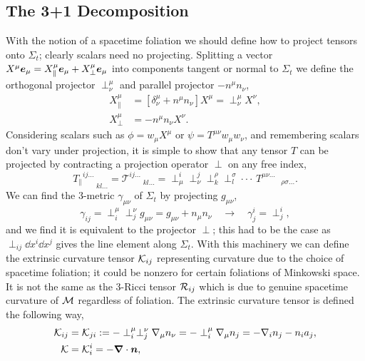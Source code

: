\subsection{The 3+1 Decomposition}
With the notion of a spacetime foliation we should define how to project tensors onto $\Sigma_t$; clearly scalars need no projecting. Splitting a vector $X^\mu \boldsymbol{e}_\mu = X^\mu_\| \boldsymbol{e}_\mu + X^\mu_\perp \boldsymbol{e}_\mu$ into components tangent or normal to $\Sigma_t$ we define the orthogonal projector $\perp^\mu_\nu$ and parallel projector $-n^\mu n_\nu$,
\begin{align}X^\mu_\| &= \left[ \delta^\mu_\nu + n^\mu n_\nu\right] X^\mu  = \perp^\mu_\nu X^\nu,\\
X^\mu_\perp &= -n^\mu n_\nu X^\nu .\end{align}
Considering scalars such as $\phi = w_\mu X^\mu$ or $\psi = T^{\mu\nu}w_\mu w_\nu$, and remembering scalars don't vary under projection, it is simple to show that any tensor $T$ can be projected by contracting a projection operator $\perp$ on any free index,
\begin{equation} {T_\|}^{ij ...}_{\;\;\;\;\;\;\;kl ...} = {\mathcal{T}}^{ij ...}_{\;\;\;\;\;\;\;kl ...} =\perp^{i}_{\mu}\perp^{j}_{\nu}\perp^{\rho}_{k}\perp^{\sigma}_{l}\cdot\cdot\cdot\, T^{\mu\nu ...}_{\;\;\;\;\;\;\;\;\;\;\rho\sigma ...}.\end{equation}
We can find the 3-metric $\gamma_{\mu\nu}$ of $\Sigma_t$ by projecting $g_{\mu\nu}$, 
\begin{equation} \gamma_{ij} = \perp^\mu_i \perp^\nu_j g_{\mu\nu} = g_{\mu\nu} + n_\mu n_\nu\quad \rightarrow \quad \gamma^i_j = \perp^i_j,\end{equation}
and we find it is equivalent to the projector $\perp$; this had to be the case as $\perp_{ij}\dd x^i\dd x^j$ gives the line element along $\Sigma_t$. With this machinery we can define the extrinsic curvature tensor $\mathcal{K}_{ij}$ representing curvature due to the choice of spacetime foliation; it could be nonzero for certain foliations of Minkowski space. It is not the same as the 3-Ricci tensor $\mathcal{R}_{ij}$ which is due to genuine spacetime curvature of $\mathcal{M}$ regardless of foliation. The extrinsic curvature tensor is defined the following way,
\begin{align} \label{nr:eq:Kij}\mathcal{K}_{ij}  &= \mathcal{K}_{ji}:= -\perp_i^\mu \perp_j^\nu \nabla_\mu n_\nu = -\perp_i^\mu \nabla_\mu n_j = -\nabla_i n_j - n_i a_j, \\
\mathcal{K} &= \mathcal{K}_i^i = -\boldsymbol{\nabla} \cdot \boldsymbol{n},\end{align}
